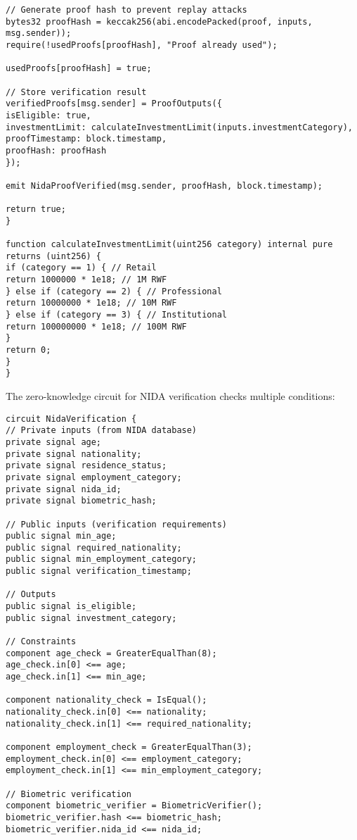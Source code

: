 \documentclass[12pt]{article}
\begin{document}
{{{\begin{lstlisting}
// Generate proof hash to prevent replay attacks
bytes32 proofHash = keccak256(abi.encodePacked(proof, inputs, msg.sender));
require(!usedProofs[proofHash], "Proof already used");

usedProofs[proofHash] = true;

// Store verification result
verifiedProofs[msg.sender] = ProofOutputs({
isEligible: true,
investmentLimit: calculateInvestmentLimit(inputs.investmentCategory),
proofTimestamp: block.timestamp,
proofHash: proofHash
});

emit NidaProofVerified(msg.sender, proofHash, block.timestamp);

return true;
}

function calculateInvestmentLimit(uint256 category) internal pure returns (uint256) {
if (category == 1) { // Retail
return 1000000 * 1e18; // 1M RWF
} else if (category == 2) { // Professional
return 10000000 * 1e18; // 10M RWF
} else if (category == 3) { // Institutional
return 100000000 * 1e18; // 100M RWF
}
return 0;
}
}
\end{lstlisting}


The zero-knowledge circuit for NIDA verification checks multiple conditions:


\begin{lstlisting}
circuit NidaVerification {
// Private inputs (from NIDA database)
private signal age;
private signal nationality;
private signal residence_status;
private signal employment_category;
private signal nida_id;
private signal biometric_hash;

// Public inputs (verification requirements)
public signal min_age;
public signal required_nationality;
public signal min_employment_category;
public signal verification_timestamp;

// Outputs
public signal is_eligible;
public signal investment_category;

// Constraints
component age_check = GreaterEqualThan(8);
age_check.in[0] <== age;
age_check.in[1] <== min_age;

component nationality_check = IsEqual();
nationality_check.in[0] <== nationality;
nationality_check.in[1] <== required_nationality;

component employment_check = GreaterEqualThan(3);
employment_check.in[0] <== employment_category;
employment_check.in[1] <== min_employment_category;

// Biometric verification
component biometric_verifier = BiometricVerifier();
biometric_verifier.hash <== biometric_hash;
biometric_verifier.nida_id <== nida_id;


\end{lstlisting}}}}
\end{document}
